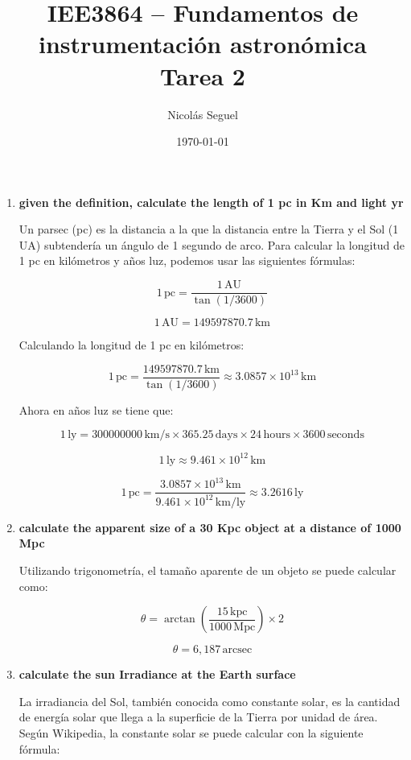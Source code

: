 \documentclass[11pt]{article}
\title{IEE3864 – Fundamentos de instrumentación astronómica \\ \large Tarea 2}
\author{Nicolás Seguel}
\date{\today}
\begin{document}
\maketitle

\begin{enumerate}
    \item \textbf{given the definition, calculate the length of 1 pc in Km and light yr}
    
Un parsec (pc) es la distancia a la que la distancia entre la Tierra y el Sol (1 UA) subtendería un ángulo de 1 segundo de arco. Para calcular la longitud de 1 pc en kilómetros y años luz, podemos usar las siguientes fórmulas:

\[
1 \, \text{pc} = \frac{1 \, \text{AU}}{\tan(1 / 3600)}
\]

\[
1 \, \text{AU} = 149597870.7 \, \text{km}
\]

Calculando la longitud de 1 pc en kilómetros:

\[
1 \, \text{pc} = \frac{149597870.7 \, \text{km}}{\tan(1 / 3600)} \approx 3.0857 \times 10^{13} \, \text{km}
\]

Ahora en años luz se tiene que:

\[
1 \, \text{ly} = 300000000 \, \text{km/s} \times 365.25 \, \text{days} \times 24 \, \text{hours} \times 3600 \, \text{seconds}
\]

\[
1 \, \text{ly} \approx 9.461 \times 10^{12} \, \text{km}
\]

\[
1 \, \text{pc} = \frac{3.0857 \times 10^{13} \, \text{km}}{9.461 \times 10^{12} \, \text{km/ly}} \approx 3.2616 \, \text{ly}
\]

    \item \textbf{calculate the apparent size of a 30 Kpc object at a distance of 1000 Mpc}
    
Utilizando trigonometría, el tamaño aparente de un objeto se puede calcular como:

\[
\theta = \arctan\left(\frac{15 \, \text{kpc}}{1000 \, \text{Mpc}}\right) \times 2
\]

\[
\theta = 6,187 \, \text{arcsec}
\]

    \item \textbf{calculate the sun Irradiance at the Earth surface}
    
La irradiancia del Sol, también conocida como constante solar, es la cantidad de energía solar que llega a la superficie de la Tierra por unidad de área. Según Wikipedia, la constante solar se puede calcular con la siguiente fórmula:


\end{enumerate}
\end{document}
